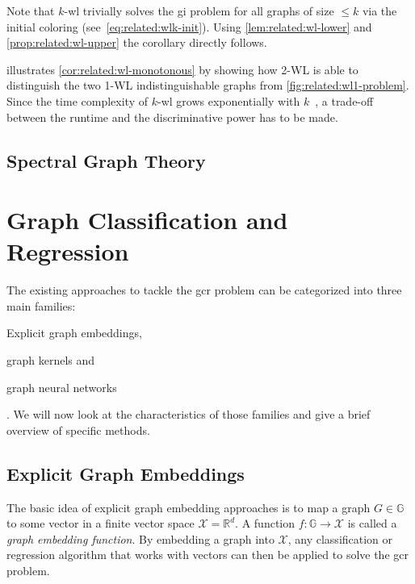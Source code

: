 \begin{hproof}
	Note that $k$-\acs{wl} trivially solves the \ac{gi} problem for all graphs of size $\leq k$ via the initial coloring (see~\cref{eq:related:wlk-init}).
	Using \cref{lem:related:wl-lower} and \cref{prop:related:wl-upper} the corollary directly follows.
\end{hproof}
 illustrates \cref{cor:related:wl-monotonous} by showing how 2-WL is able to distinguish the two 1-WL indistinguishable graphs from \cref{fig:related:wl1-problem}.
Since the time complexity of $k$-\acs{wl} grows exponentially with $k$~\cite[corr.~1.9.7]{Immerman1990}, a trade-off between the runtime and the discriminative power has to be made.

\subsection{Spectral Graph Theory}%
\label{sec:related:character:spectral}

\section{Graph Classification and Regression}%
\label{sec:related:gcr}

The existing approaches to tackle the \ac{gcr} problem can be categorized into three main families:
\begin{enumerate*}
	\item Explicit graph embeddings,
	\item graph kernels and
	\item graph neural networks
\end{enumerate*}.
We will now look at the characteristics of those families and give a brief overview of specific methods.

\subsection{Explicit Graph Embeddings}%
\label{sec:related:gcr:embed}

The basic idea of explicit graph embedding approaches is to map a graph $G \in \mathbb{G}$ to some vector in a finite vector space $\mathcal{X} = \mathbb{R}^d$.
A function $f: \mathbb{G} \to \mathcal{X}$ is called a \textit{graph embedding function}.
By embedding a graph into $\mathcal{X}$, any classification or regression algorithm that works with vectors can then be applied to solve the \ac{gcr} problem.

